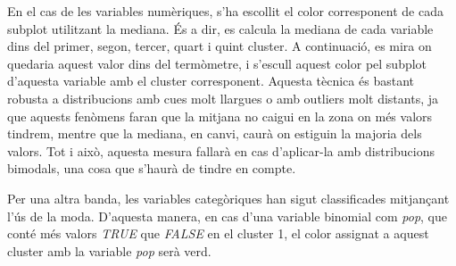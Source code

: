 En el cas de les variables numèriques, s'ha escollit el color corresponent de cada subplot utilitzant la mediana. És a dir, es calcula la mediana de cada variable dins del primer, segon, tercer, quart i quint cluster. A continuació, es mira on quedaria aquest valor dins del termòmetre, i s'escull aquest color pel subplot d'aquesta variable amb el cluster corresponent. Aquesta tècnica és bastant robusta a distribucions amb cues molt llargues o amb outliers molt distants, ja que aquests fenòmens faran que la mitjana no caigui en la zona on més valors tindrem, mentre que la mediana, en canvi, caurà on estiguin la majoria dels valors. Tot i això, aquesta mesura fallarà en cas d'aplicar-la amb distribucions bimodals, una cosa que s'haurà de tindre en compte.

Per una altra banda, les variables categòriques han sigut classificades mitjançant l'ús de la moda. D'aquesta manera, en cas d'una variable binomial com \textit{pop}, que conté més valors \textit{TRUE} que \textit{FALSE} en el cluster 1, el color assignat a aquest cluster amb la variable \textit{pop} serà verd.

